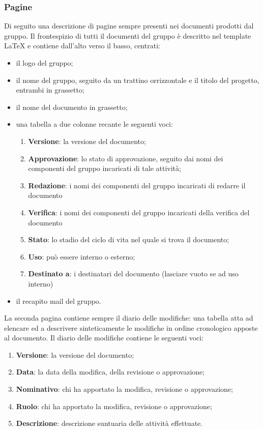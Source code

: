 	    \subsubsection{Pagine}
	    Di seguito una descrizione di pagine sempre presenti nei documenti prodotti dal gruppo.
	    Il frontespizio di tutti il documenti del gruppo è descritto nel template LaTeX e contiene dall'alto verso il basso, centrati:
	    \begin{itemize}
	        \item il logo del gruppo;
	        \item il nome del gruppo, seguito da un trattino orrizzontale e il titolo del progetto, entrambi in grassetto;
	        \item il nome del documento in grassetto;
	        \item una tabella a due colonne recante le seguenti voci:
	        \begin{enumerate}
	            \item \textbf{Versione}: la versione del documento;
	            \item \textbf{Approvazione}: lo stato di approvazione, seguito dai nomi dei componenti del gruppo incaricati di tale attività;
	            \item \textbf{Redazione}: i nomi dei componenti del gruppo incaricati di redarre il documento
	            \item \textbf{Verifica}: i nomi dei componenti del gruppo incaricati della verifica del documento
	            \item \textbf{Stato}: lo stadio del ciclo di vita nel quale si trova il documento;
	            \item \textbf{Uso}: può essere interno o esterno;
	            \item \textbf{Destinato a}: i destinatari del documento (lasciare vuoto se ad uso interno)
	        \end{enumerate}
	        \item il recapito mail del gruppo.
	    \end{itemize}
	    La seconda pagina contiene sempre il diario delle modifiche: una tabella atta ad elencare ed a descrivere sinteticamente le modifiche in ordine cronologico apposte al documento.
	    Il diario delle modifiche contiene le seguenti voci:
	    \begin{enumerate}
	        \item \textbf{Versione}: la versione del documento;
	        \item \textbf{Data}: la data della modifica, della revisione o approvazione;
	        \item \textbf{Nominativo}: chi ha apportato la modifica, revisione o approvazione;
	        \item \textbf{Ruolo}: chi ha apportato la modifica, revisione o approvazione;
	        \item \textbf{Descrizione}: descrizione suntuaria delle attività effettuate.
	    \end{enumerate}
